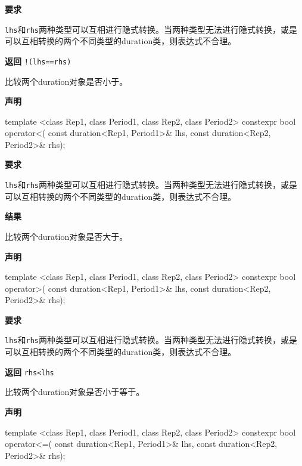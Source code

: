 \textbf{要求}

\texttt{lhs}和\texttt{rhs}两种类型可以互相进行隐式转换。当两种类型无法进行隐式转换，或是可以互相转换的两个不同类型的duration类，则表达式不合理。

\textbf{返回}
\texttt{!(lhs==rhs)}


比较两个duration对象是否小于。

\textbf{声明}

\begin{cpp}
template <class Rep1, class Period1, class Rep2, class Period2>
constexpr bool operator<(
   const duration<Rep1, Period1>& lhs,
   const duration<Rep2, Period2>& rhs);
\end{cpp}

\textbf{要求}

\texttt{lhs}和\texttt{rhs}两种类型可以互相进行隐式转换。当两种类型无法进行隐式转换，或是可以互相转换的两个不同类型的duration类，则表达式不合理。

\textbf{结果}



比较两个duration对象是否大于。

\textbf{声明}

\begin{cpp}
template <class Rep1, class Period1, class Rep2, class Period2>
constexpr bool operator>(
   const duration<Rep1, Period1>& lhs,
   const duration<Rep2, Period2>& rhs);
\end{cpp}

\textbf{要求}

\texttt{lhs}和\texttt{rhs}两种类型可以互相进行隐式转换。当两种类型无法进行隐式转换，或是可以互相转换的两个不同类型的duration类，则表达式不合理。

\textbf{返回}
\texttt{rhs<lhs}


比较两个duration对象是否小于等于。

\textbf{声明}

\begin{cpp}
template <class Rep1, class Period1, class Rep2, class Period2>
constexpr bool operator<=(
   const duration<Rep1, Period1>& lhs,
   const duration<Rep2, Period2>& rhs);
\end{cpp}

